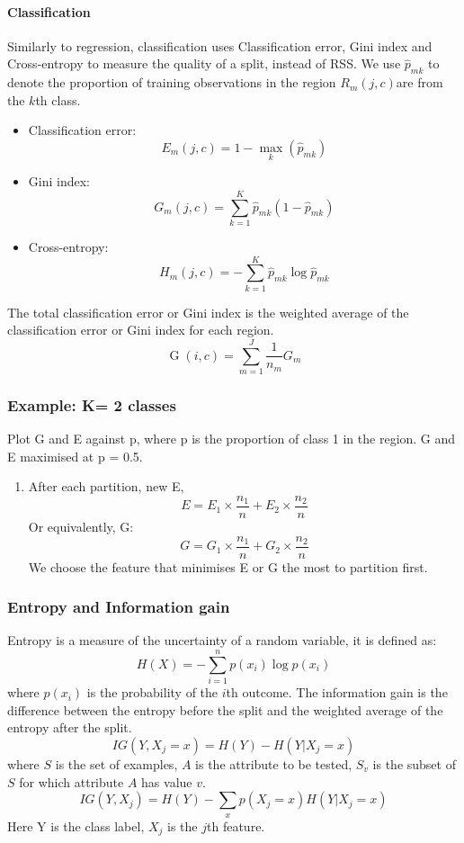 \documentclass[12pt,a4paper]{article}
\begin{document}
    \paragraph{Classification}
    Similarly to regression, classification uses Classification error, Gini index and Cross-entropy to measure the quality of a split, instead of RSS.
    We use $\hat{p}_{m k}$ to denote the proportion of training observations in the region $R_m(j,c)$are from the $k$th class. 
    \begin{itemize}
        \item Classification error: 
        $$
        E_m(j,c) = 1 - \max_k(\hat{p}_{m k})
        $$
        \item Gini index:
        $$
        G_m(j,c) = \sum_{k=1}^K \hat{p}_{m k} (1 - \hat{p}_{m k})
        $$
        \item Cross-entropy:
        $$
        H_m(j,c) = - \sum_{k=1}^K \hat{p}_{m k} \log \hat{p}_{m k}
        $$
    \end{itemize}
    The total classification error or Gini index is the weighted average of the classification error or Gini index for each region.
    $$
    \operatorname{G}(i,c)=\sum_{m=1}^{J} \frac{1}{n_m} G_{m}
    $$
    \subsubsection{Example: K= 2 classes}
    Plot G and E against p, where p is the proportion of class 1 in the region.
    G and E maximised at p = 0.5. 
    \begin{enumerate}
        \item After each partition, new E,
        $$
        E = E_1 \times \frac{n_1}{n} + E_2 \times \frac{n_2}{n}
        $$
        Or equivalently, G:
        $$
        G = G_1 \times \frac{n_1}{n} + G_2 \times \frac{n_2}{n}
        $$
        We choose the feature that minimises E or G the most to partition first.
    \end{enumerate}
    \subsubsection{Entropy and Information gain}
    Entropy is a measure of the uncertainty of a random variable, it is defined as:
    $$
    H(X)=-\sum_{i=1}^{n} p\left(x_{i}\right) \log p\left(x_{i}\right)
    $$
    where $p(x_i)$ is the probability of the $i$th outcome.
    The information gain is the difference between the entropy before the split and the weighted average of the entropy after the split.
    $$
    IG(Y, X_j= x) = H(Y) - H(Y|X_j=x)
    $$
    where $S$ is the set of examples, $A$ is the attribute to be tested, $S_v$ is the subset of $S$ for which attribute $A$ has value $v$.
    $$
    IG(Y, X_j) = H(Y) - \sum_{x} p(X_j=x) H(Y|X_j=x)
    $$
    Here Y is the class label, $X_j$ is the $j$th feature.
\end{document}
